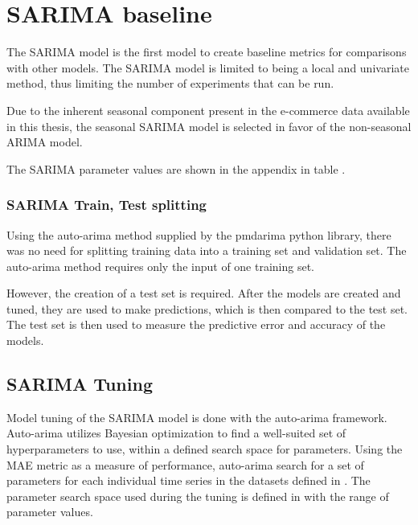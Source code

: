 
\section{SARIMA baseline}
\label{section:Method:SARIMA}

The SARIMA model is the first model to create baseline metrics for comparisons with other models.
The SARIMA model is limited to being a local and univariate method,
thus limiting the number of experiments that can be run.

Due to the inherent seasonal component present in the e-commerce data available in this thesis,
the seasonal SARIMA model is selected in favor of the non-seasonal ARIMA model.

The SARIMA parameter values are shown in the appendix in table .


\subsubsection{SARIMA Train, Test splitting}
Using the auto-arima method supplied by the pmdarima python library,
there was no need for splitting training data into a training set and validation set.
The auto-arima method requires only the input of one training set.

However, the creation of a test set is required.
After the models are created and tuned, they are used to make predictions,
which is then compared to the test set.
The test set is then used to measure the predictive error and accuracy of the models.




\subsection{SARIMA Tuning}
Model tuning of the SARIMA model is done with the auto-arima framework.
Auto-arima utilizes Bayesian optimization to find a well-suited set of hyperparameters to use,
within a defined search space for parameters.
Using the MAE metric as a measure of performance, auto-arima search for a set of parameters for each individual time series
in the datasets defined in .
The parameter search space used during the tuning is defined in  with the range of parameter values.

